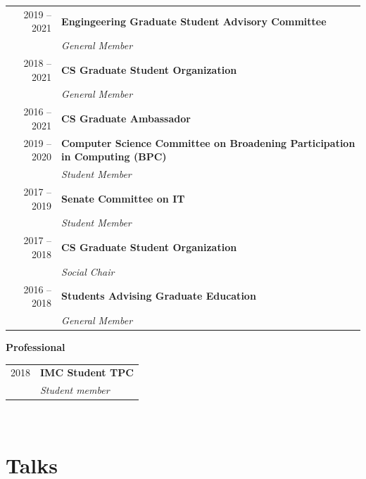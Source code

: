 \documentclass[10pt,singlecolumn]{article} %
\begin{document}
\begin{tabular}{rl}

2019 -- \textsc{2021} & \textbf{Engingeering Graduate Student Advisory Committee}\\
& \emph{General Member} \\

2018 -- \textsc{2021} & \textbf{CS Graduate Student Organization}\\
& \emph{General Member} \\

2016 -- \textsc{2021} & \textbf{CS Graduate Ambassador}\\

2019 -- 2020 & \textbf{Computer Science Committee on Broadening Participation in Computing (BPC)} \\
& \emph{Student Member} \\

2017 -- 2019 & \textbf{Senate Committee on IT} \\
& \emph{Student Member} \\

2017 -- 2018 & \textbf{CS Graduate Student Organization}\\
& \emph{Social Chair} \\

2016 -- 2018 & \textbf{Students Advising Graduate Education}\\
& \emph{General Member} \\

\end{tabular} 

\vspace{0.3cm}
\textbf{Professional}\\

\begin{tabular}{rl}
2018 & \textbf{IMC Student TPC} \\
& \emph{Student member}\\
\end{tabular} \\


\section{Talks} 
\end{document}
